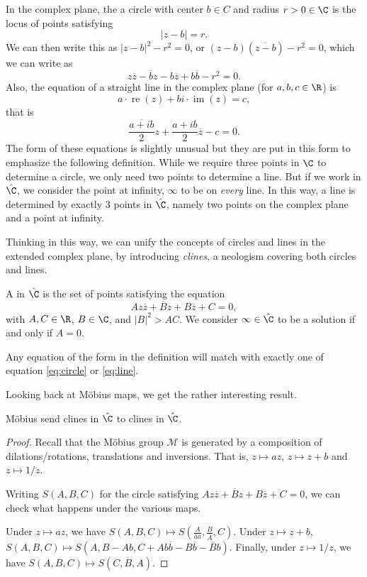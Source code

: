 In the complex plane, the a circle with center $b \in C$ and radius $r > 0 \in \C$ is the locus of points satisfying
$$
|z - b| = r.
$$
We can then write this as $|z - b|^2 - r^2 = 0$, or $(z - b)(\overline{z - b}) - r^2 = 0$, which we can write as
\begin{equation}\label{eq:circle}
	z \overline{z} - \overline{b}z - b \overline{z} + b \overline{b} - r^2 = 0.
	\tag{$*$}
\end{equation}
Also, the equation of a straight line in the complex plane (for $a, b, c \in \R$) is
$$
	a \cdot \operatorname{re}(z) + bi \cdot \operatorname{im}(z) = c,
$$
that is
\begin{equation}\label{eq:line}
\frac{\overline{a + i b}}{2}z + \frac{a + ib}{2} \overline{z} - c = 0.
\tag{$\dagger$}	
\end{equation}
The form of these equations is slightly unusual but they are put in this form to emphasize the following definition.
While we require three points in $\C$ to determine a circle, we only need two points to determine a line. But if we work in $\hat{\C}$, we consider the point at infinity, $\infty$ to be on \emph{every} line. In this way, a line is determined by exactly 3 points in $\hat{\C}$, namely two points on the complex plane and a point at infinity.

Thinking in this way, we can unify the concepts of circles and lines in the extended complex plane, by introducing \emph{clines}, a neologism covering both circles and lines. 

\begin{definition}
A  in $\hat{\C}$ is the set of points satisfying the equation
$$
A z \overline{z} + \overline{B}z + B \overline{z} + C = 0,
$$
with $A, C \in \R$, $B \in \C$, and $|B|^2 > AC$. We consider $\infty \in \hat{\C}$ to be a solution if and only if $A = 0$.  
\end{definition}

Any equation of the form in the definition will match with exactly one of equation \eqref{eq:circle} or \eqref{eq:line}.

Looking back at Möbius maps, we get the rather interesting result.
\begin{theorem}
	Möbius send clines in $\hat{\C}$ to clines in $\hat{\C}$.
\end{theorem}
\begin{proof}
	Recall that the Möbius group $\mathcal{M}$ is generated by a composition of dilations/rotations, translations and inversions. That is, $z \mapsto az$, $z \mapsto z + b$ and $z \mapsto 1/z$.

	Writing $S(A, B, C)$ for the circle satisfying $A z \overline{z} + \overline{B}z + B \overline{z} + C = 0$, we can check what happens under the various maps.

	Under $z \mapsto az$, we have $S(A, B, C) \mapsto S\left(\frac{A}{\overline{a}a}, \frac{B}{\overline{A}}, C\right)$. Under $z \mapsto z + b$, $S(A, B, C) \mapsto S(A, B - Ab, C + A b \overline{b} - B \overline{b} - \overline{B} b)$. Finally, under $z \mapsto 1/z$, we have $S(A, B, C) \mapsto S(C, \overline{B}, A)$.
\end{proof}

